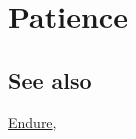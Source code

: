 \section{Patience}
	\label{PATIENCE}
	
\subsection{See also}

	\hyperref[ENDURE]{Endure},




	

	

